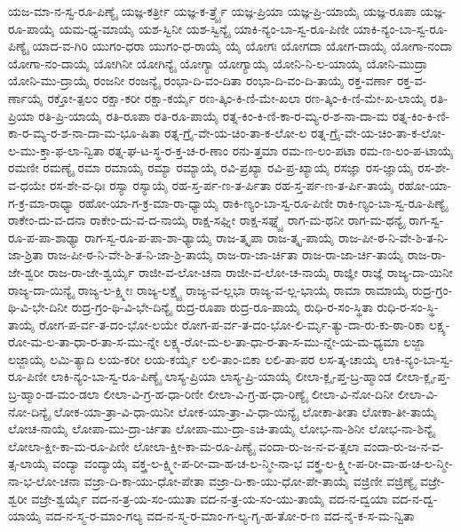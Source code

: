 {ಯಜ-ಮಾ-ನ-ಸ್ವ-ರೂ-ಪಿಣ್ಯೈ
ಯಜ್ಞ-ಕರ್ತ್ರೀ
ಯಜ್ಞ-ಕ-ರ್ತ್ರ್ಯೈ
ಯಜ್ಞ-ಪ್ರಿಯಾ
ಯಜ್ಞ-ಪ್ರಿ-ಯಾಯೈ
ಯಜ್ಞ-ರೂಪಾ
ಯಜ್ಞ-ರೂ-ಪಾಯೈ
ಯಮ-ಧ್ಯ-ಮಾಯೈ
ಯಶ-ಸ್ವಿನೀ
ಯಶ-ಸ್ವಿನ್ಯೈ
ಯಾಕಿ-ನ್ಯಂ-ಬಾ-ಸ್ವ-ರೂ-ಪಿಣೀ
ಯಾಕಿ-ನ್ಯಂ-ಬಾ-ಸ್ವ-ರೂ-ಪಿಣ್ಯೈ
ಯಾದ-ವ-ಗಿರಿ
ಯುಗಂ-ಧರಾ
ಯುಗಂ-ಧ-ರಾಯೈ
ಯೈ
ಯೋಗಃ
ಯೋಗದಾ
ಯೋಗ-ದಾಯೈ
ಯೋಗಾ-ನಂದಾ
ಯೋಗಾ-ನಂ-ದಾಯೈ
ಯೋಗಿನೀ
ಯೋಗಿನ್ಯೈ
ಯೋಗ್ಯಾ
ಯೋಗ್ಯಾಯೈ
ಯೋನಿ-ನಿ-ಲ-ಯಾಯೈ
ಯೋನಿ-ಮುದ್ರಾ
ಯೋನಿ-ಮು-ದ್ರಾಯೈ
ರಂಜನೀ
ರಂಜನ್ಯೈ
ರಂಭಾ-ದಿ-ವಂ-ದಿತಾ
ರಂಭಾ-ದಿ-ವಂ-ದಿ-ತಾಯೈ
ರಕ್ತ-ವರ್ಣಾ
ರಕ್ತ-ವ-ರ್ಣಾಯೈ
ರಕ್ತೋ-ತ್ಪಲಂ
ರಕ್ಷಾ-ಕರೀ
ರಕ್ಷಾ-ಕರ್ಯೈ
ರಣ-ತ್ಕಿಂ-ಕಿ-ಣಿ-ಮೇ-ಖಲಾ
ರಣ-ತ್ಕಿಂ-ಕಿ-ಣಿ-ಮೇ-ಖ-ಲಾಯೈ
ರತಿ-ಪ್ರಿಯಾ
ರತಿ-ಪ್ರಿ-ಯಾಯೈ
ರತಿ-ರೂಪಾ
ರತಿ-ರೂ-ಪಾಯೈ
ರತ್ನ-ಕಿಂ-ಕಿ-ಣಿ-ಕಾ-ರ-ಮ್ಯ-ರ-ಶ-ನಾ-ದಾ-ಮ
ರತ್ನ-ಕಿಂ-ಕಿ-ಣಿ-ಕಾ-ರ-ಮ್ಯ-ರ-ಶ-ನಾ-ದಾ-ಮ-ಭೂ-ಷಿತಾ
ರತ್ನ-ಗ್ರೈ-ವೇ-ಯ-ಚಿಂ-ತಾ-ಕ-ಲೋ-ಲ
ರತ್ನ-ಗ್ರೈ-ವೇ-ಯ-ಚಿಂ-ತಾ-ಕ-ಲೋ-ಲ-ಮು-ಕ್ತಾ-ಫ-ಲಾ-ನ್ವಿತಾ
ರತ್ನ-ಘ-ಟ-ಸ್ಥ-ರ-ಕ್ತ-ಚ-ರ-ಣಾಂ
ರನು-ತ್ತಮಾ
ರಮ-ಣ-ಲಂ-ಪಟಾ
ರಮ-ಣ-ಲಂ-ಪ-ಟಾಯೈ
ರಮಣೀ
ರಮಣ್ಯೈ
ರಮಾ
ರಮಾಯೈ
ರಮ್ಯಾ
ರಮ್ಯಾಯೈ
ರವಿ-ಪ್ರಖ್ಯಾ
ರವಿ-ಪ್ರ-ಖ್ಯಾಯೈ
ರಸಜ್ಞಾ
ರಸ-ಜ್ಞಾಯೈ
ರಸ-ಶೇ-ವ-ಧಯೇ
ರಸ-ಶೇ-ವ-ಧಿಃ
ರಸ್ಯಾ
ರಸ್ಯಾಯೈ
ರಹ-ಸ್ತ-ರ್ಪ-ಣ-ತ-ರ್ಪಿತಾ
ರಹ-ಸ್ತ-ರ್ಪ-ಣ-ತ-ರ್ಪಿ-ತಾಯೈ
ರಹೋ-ಯಾ-ಗ-ಕ್ರ-ಮಾ-ರಾಧ್ಯಾ
ರಹೋ-ಯಾ-ಗ-ಕ್ರ-ಮಾ-ರಾ-ಧ್ಯಾಯೈ
ರಾಕಿ-ಣ್ಯಂ-ಬಾ-ಸ್ವ-ರೂ-ಪಿಣೀ
ರಾಕಿ-ಣ್ಯಂ-ಬಾ-ಸ್ವ-ರೂ-ಪಿಣ್ಯೈ
ರಾಕೇಂ-ದು-ವ-ದನಾ
ರಾಕೇಂ-ದು-ವ-ದ-ನಾಯೈ
ರಾಕ್ಷ-ಸಘ್ನೀ
ರಾಕ್ಷ-ಸಘ್ನ್ಯೈ
ರಾಗ-ಮ-ಥನೀ
ರಾಗ-ಮ-ಥನ್ಯೈ
ರಾಗ-ಸ್ವ-ರೂ-ಪ-ಪಾ-ಶಾಢ್ಯಾ
ರಾಗ-ಸ್ವ-ರೂ-ಪ-ಪಾ-ಶಾ-ಢ್ಯಾಯೈ
ರಾಜ-ತ್ಕೃಪಾ
ರಾಜ-ತ್ಕೃ-ಪಾಯೈ
ರಾಜ-ಪೀ-ಠ-ನಿ-ವೇ-ಶಿ-ತ-ನಿ-ಜಾ-ಶ್ರಿತಾ
ರಾಜ-ಪೀ-ಠ-ನಿ-ವೇ-ಶಿ-ತ-ನಿ-ಜಾ-ಶ್ರಿ-ತಾಯೈ
ರಾಜ-ರಾ-ಜಾ-ರ್ಚಿತಾ
ರಾಜ-ರಾ-ಜಾ-ರ್ಚಿ-ತಾಯೈ
ರಾಜ-ರಾ-ಜೇ-ಶ್ವರೀ
ರಾಜ-ರಾ-ಜೇ-ಶ್ವರ್ಯೈ
ರಾಜೀ-ವ-ಲೋ-ಚನಾ
ರಾಜೀ-ವ-ಲೋ-ಚ-ನಾಯೈ
ರಾಜ್ಞೀ
ರಾಜ್ಞೆ
ರಾಜ್ಯ-ದಾ-ಯಿನೀ
ರಾಜ್ಯ-ದಾ-ಯಿನ್ಯೈ
ರಾಜ್ಯ-ಲ-ಕ್ಷ್ಮೀಃ
ರಾಜ್ಯ-ಲಕ್ಷ್ಯೈ
ರಾಜ್ಯ-ವ-ಲ್ಲಭಾ
ರಾಜ್ಯ-ವ-ಲ್ಲ-ಭಾಯೈ
ರಾಮಾ
ರಾಮಾಯೈ
ರುದ್ರ-ಗ್ರಂ-ಥಿ-ವಿ-ಭೇ-ದಿನೀ
ರುದ್ರ-ಗ್ರಂ-ಥಿ-ವಿ-ಭೇ-ದಿನ್ಯೈ
ರುದ್ರ-ರೂಪಾ
ರುದ್ರ-ರೂ-ಪಾಯೈ
ರುಧಿ-ರ-ಸಂ-ಸ್ಥಿತಾ
ರುಧಿ-ರ-ಸಂ-ಸ್ಥಿ-ತಾಯೈ
ರೋಗ-ಪ-ರ್ವ-ತ-ದಂ-ಭೋ-ಲಯೇ
ರೋಗ-ಪ-ರ್ವ-ತ-ದಂ-ಭೋ-ಲಿ-ರ್ಮೃ-ತ್ಯು-ದಾ-ರು-ಕು-ಠಾ-ರಿಕಾ
ಲಕ್ಷ್ಯ-ರೋ-ಮ-ಲ-ತಾ-ಧಾ-ರ-ತಾ-ಸ-ಮು-ನ್ನೇ
ಲಕ್ಷ್ಯ-ರೋ-ಮ-ಲ-ತಾ-ಧಾ-ರ-ತಾ-ಸ-ಮು-ನ್ನೇ-ಯ-ಮ-ಧ್ಯಮಾ
ಲಜ್ಜಾ
ಲಜ್ಜಾಯೈ
ಲಮಿ-ತ್ಯಾದಿ
ಲಯ-ಕರೀ
ಲಯ-ಕರ್ಯೈ
ಲಲಿ-ತಾಂ-ಬಿಕಾ
ಲಲಿ-ತಾ-ಪರ
ಲಸ-ತ್ಕ-ಚಾಯೈ
ಲಾಕಿ-ನ್ಯಂ-ಬಾ-ಸ್ವ-ರೂ-ಪಿಣೀ
ಲಾಕಿ-ನ್ಯಂ-ಬಾ-ಸ್ವ-ರೂ-ಪಿಣ್ಯೈ
ಲಾಸ್ಯ-ಪ್ರಿಯಾ
ಲಾಸ್ಯ-ಪ್ರಿ-ಯಾಯೈ
ಲೀಲಾ-ಕ್ಲೃ-ಪ್ತ-ಬ್ರ-ಹ್ಮಾಂಡ
ಲೀಲಾ-ಕ್ಲೃ-ಪ್ತ-ಬ್ರ-ಹ್ಮಾಂ-ಡ-ಮಂ-ಡಲಾ
ಲೀಲಾ-ವಿ-ಗ್ರ-ಹ-ಧಾ-ರಿಣೀ
ಲೀಲಾ-ವಿ-ಗ್ರ-ಹ-ಧಾ-ರಿಣ್ಯೈ
ಲೀಲಾ-ವಿ-ನೋ-ದಿನೀ
ಲೀಲಾ-ವಿ-ನೋ-ದಿನ್ಯೈ
ಲೋಕ-ಯಾ-ತ್ರಾ-ವಿ-ಧಾ-ಯಿನೀ
ಲೋಕ-ಯಾ-ತ್ರಾ-ವಿ-ಧಾ-ಯಿನ್ಯೈ
ಲೋಕಾ-ತೀತಾ
ಲೋಕಾ-ತೀ-ತಾಯೈ
ಲೋಚ-ನಾಯೈ
ಲೋಪಾ-ಮು-ದ್ರಾ-ರ್ಚಿತಾ
ಲೋಪಾ-ಮು-ದ್ರಾ-ಽಚಿ-ತಾಯೈ
ಲೋಭ-ನಾ-ಶಿನೀ
ಲೋಭ-ನಾ-ಶಿನ್ಯೈ
ಲೋಲಾ-ಕ್ಷೀ-ಕಾ-ಮ-ರೂ-ಪಿಣೀ
ಲೋಲಾ-ಕ್ಷೀ-ಕಾ-ಮ-ರೂ-ಪಿಣ್ಯೈ
ವಂದಾ-ರು-ಜ-ನ-ವ-ತ್ಸಲಾ
ವಂದಾ-ರು-ಜ-ನ-ವ-ತ್ಸ-ಲಾಯೈ
ವಂದ್ಯಾ
ವಂದ್ಯಾಯೈ
ವಕ್ತ್ರ-ಲ-ಕ್ಷ್ಮೀ-ಪ-ರೀ-ವಾ-ಹ-ಚ-ಲ-ನ್ಮೀ-ನಾ-ಭ
ವಕ್ತ್ರ-ಲ-ಕ್ಷ್ಮೀ-ಪ-ರೀ-ವಾ-ಹ-ಚ-ಲ-ನ್ಮೀ-ನಾ-ಭ-ಲೋ-ಚನಾ
ವಜ್ರಾ-ದಿ-ಕಾ-ಯು-ಧೋ-ಪೇತಾ
ವಜ್ರಾ-ದಿ-ಕಾ-ಯು-ಧೋ-ಪೇ-ತಾಯೈ
ವಜ್ರಿಣೀ
ವಜ್ರಿಣ್ಯೈ
ವಜ್ರೇ-ಶ್ವರೀ
ವಜ್ರೇ-ಶ್ವರ್ಯೈ
ವದ-ನ-ತ್ರ-ಯ-ಸಂ-ಯುತಾ
ವದ-ನ-ತ್ರ-ಯ-ಸಂ-ಯು-ತಾಯೈ
ವದ-ನ-ದ್ವಯಾ
ವದ-ನ-ದ್ವ-ಯಾಯೈ
ವದ-ನ-ಸ್ಮ-ರ-ಮಾಂ-ಗಲ್ಯ
ವದ-ನ-ಸ್ಮ-ರ-ಮಾಂ-ಗ-ಲ್ಯ-ಗೃ-ಹ-ತೋ-ರ-ಣ
ವದ-ನೈ-ಕ-ಸ-ಮ-ನ್ವಿತಾ
}
